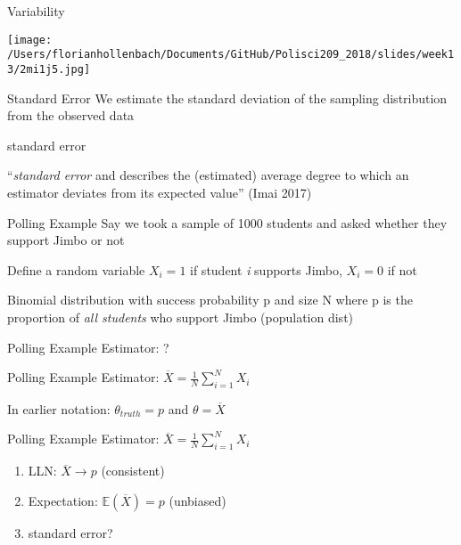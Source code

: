 \documentclass[presentation]{beamer}
\newcommand{\E}{\mathbb{E}}
\begin{document}
\begin{frame}[label={sec:org2079ffd}]{Variability}
\begin{center}
\texttt{[image: /Users/florianhollenbach/Documents/GitHub/Polisci209\_2018/slides/week13/2mi1j5.jpg]}
\end{center}
\end{frame}


\begin{frame}[label={sec:org4226bdd}]{Standard Error}
We estimate the standard deviation of the sampling distribution from the observed data

\alert{standard error}

\pause

``\emph{standard error} and describes the (estimated) average degree to which an estimator deviates from its expected value'' (Imai 2017)
\end{frame}

\begin{frame}[label={sec:org88e4602}]{Polling Example}
Say we took a sample of 1000 students and asked whether they support Jimbo or not

Define a random variable \(X_{i} = 1\) if student \emph{i} supports Jimbo, \(X_{i}=0\) if not

Binomial distribution with success probability p and size N where p is the proportion of \emph{all students} who support Jimbo (population dist)
\end{frame}


\begin{frame}[label={sec:org7ae15ce}]{Polling Example}
Estimator: ?
\end{frame}

\begin{frame}[label={sec:orgbfcc568}]{Polling Example}
Estimator: \(\overline{X} = \frac{1}{N} \sum_{i=1}^{N} X_{i}\)

\pause

In earlier notation: \(\theta_{truth} =p\) and \(\theta = \overline{X}\)
\end{frame}


\begin{frame}[label={sec:org11a177f}]{Polling Example}
Estimator: \(\overline{X} = \frac{1}{N} \sum_{i=1}^{N} X_{i}\)

\begin{enumerate}
\item LLN: \(\overline{X} \longrightarrow p\) (\alert{consistent})

\item Expectation: \(\E(\overline{X}) = p\) (\alert{unbiased})

\item standard error?
\end{enumerate}
\end{frame}
\end{document}
